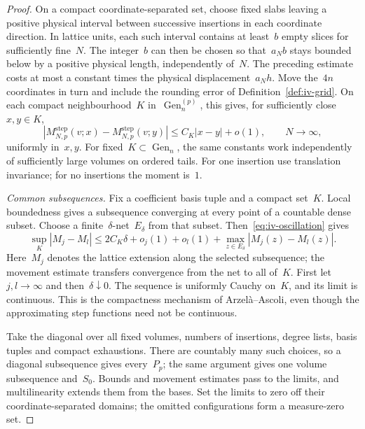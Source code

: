 \begin{proof}
On a compact coordinate-separated set, choose fixed slabs leaving a positive physical interval between successive insertions in each coordinate direction. In lattice units, each such interval contains at least~$b$ empty slices for sufficiently fine~$N$.
The integer~$b$ can then be chosen so that~$a_Nb$ stays bounded below by a positive physical length, independently of~$N$.
The preceding estimate costs at most a constant times the physical displacement~$a_Nh$.
Move the~$4n$ coordinates in turn and include the rounding error of Definition~\ref{def:iv-grid}.
On each compact neighbourhood~$K$ in~$\operatorname{Gen}^{(p)}_n$, this gives, for sufficiently close~$x,y\in K$,
\begin{equation}\label{eq:iv-oscillation}
 |M^{\mathrm{step}}_{N,p}(v;x)-M^{\mathrm{step}}_{N,p}(v;y)|
 \le C_K|x-y|+o(1),\qquad N\longrightarrow\infty,
\end{equation}
uniformly in~$x,y$.
For fixed~$K\subset\operatorname{Gen}_n$, the same constants work independently of sufficiently large volumes on ordered tails.
For one insertion use translation invariance; for no insertions the moment is~$1$.

\emph{Common subsequences.}
Fix a coefficient basis tuple and a compact set~$K$.
Local boundedness gives a subsequence converging at every point of a countable dense subset.
Choose a finite~$\delta$-net~$E_\delta$ from that subset.
Then~\eqref{eq:iv-oscillation} gives
\begin{equation*}
 \sup_K|M_j-M_l|
 \le 2C_K\delta+o_j(1)+o_l(1)
       +\max_{z\in E_\delta}|M_j(z)-M_l(z)|.
\end{equation*}
Here~$M_j$ denotes the lattice extension along the selected subsequence; the movement estimate transfers convergence from the net to all of~$K$.
First let~$j,l\to\infty$ and then~$\delta\downarrow0$.
The sequence is uniformly Cauchy on~$K$, and its limit is continuous.
This is the compactness mechanism of Arzel\`a--Ascoli, even though the approximating step functions need not be continuous.

Take the diagonal over all fixed volumes, numbers of insertions, degree lists, basis tuples and compact exhaustions.
There are countably many such choices, so a diagonal subsequence gives every~$P_p$; the same argument gives one volume subsequence and~$S_0$. Bounds and movement estimates pass to the limits, and multilinearity extends them from the bases.
Set the limits to zero off their coordinate-separated domains; the omitted configurations form a measure-zero set.


\end{proof}
